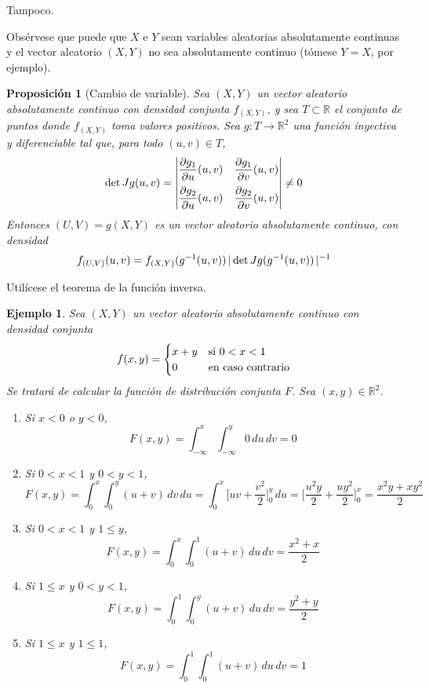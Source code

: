 \documentclass[11pt]{report}
\makeatletter
\renewenvironment{proof}[1][\proofname]{\par
  \pushQED{\qed}%
  \normalfont \topsep\z@skip %
  \trivlist
  \item[\hskip\labelsep
        \itshape
    #1\@addpunct{.}]\ignorespaces
}{%
  \popQED\endtrivlist\@endpefalse
}
\theoremstyle{mytheorem}
\newtheorem{proposition}{Proposición}
\theoremstyle{mydefinition}
\theoremstyle{myexample}
\newtheorem*{example}{Ejemplo}
\let\oldproofname=\proofname
\renewcommand{\proofname}{\rm\bf{\oldproofname}}}
\newenvironment{cproposition} %
  {\begin{mdframed}[
        linewidth=3pt,
        linecolor=c2,
        bottomline=false,
        topline=false,
        rightline=false,
        innerrightmargin=0pt,
        innertopmargin=0pt,
        innerbottommargin=0pt,
        innerleftmargin=1em,
        skipabove=\baselineskip]
    \begin{proposition}}
  {\end{proposition}\end{mdframed}}
\newcommand{\R}{\mathbb R}
\makeatother
\begin{document}
\vspace{0.5\baselineskip}

\begin{proof}
Tampoco.
\end{proof}

Obsérvese que puede que $X$ e $Y$ sean variables aleatorias absolutamente continuas y el vector aleatorio $(X,Y)$ no sea absolutamente continuo (tómese $Y = X$, por ejemplo).

\begin{cproposition}[{Cambio de variable}]
Sea $(X,Y)$ un vector aleatorio absolutamente continuo con densidad conjunta $f_{(X,Y)}$, y sea $T \subset \R$ el conjunto de puntos donde $f_{(X,Y)}$ toma valores positivos. Sea $g \colon T \to \R^2$ una función inyectiva y diferenciable tal que, para todo $(u,v) \in T$,
\[\textup{det}\,Jg(u,v) = \begin{vmatrix}
    \displaystyle\frac{\partial g_1}{\partial u}(u,v) & \displaystyle\frac{\partial g_1}{\partial v}(u,v) \\[9pt]
    \displaystyle\frac{\partial g_2}{\partial u}(u,v) & \displaystyle\frac{\partial g_2}{\partial v}(u,v) \\    
\end{vmatrix} \neq 0\]
Entonces $(U,V) = g(X,Y)$ es un vector aleatorio absolutamente continuo, con densidad
\[f_{(U,V)}(u,v) = f_{(X,Y)}(g^{-1}(u,v))\, |\,\textup{det}\,Jg(g^{-1}(u,v))\,|^{-1}\]
\end{cproposition}

\begin{proof}
Utilícese el teorema de la función inversa.
\end{proof}

\begin{example}
Sea $(X,Y)$ un vector aleatorio absolutamente continuo con densidad conjunta 
\[f(x,y) = \begin{cases}
    x+y & $si$ \ 0<x<1 \\
    0 & $en caso contrario$
\end{cases}\]
Se tratará de calcular la función de distribución conjunta $F$. Sea $(x,y) \in \R^2$.
\begin{enumerate}
    \item Si $x < 0$ o $y < 0$,
    \[F(x,y) = \int_{-\infty}^x \int_{-\infty}^y 0\, du \, dv = 0\]
    \item Si $0<x<1$ y $0<y<1$,
    \[
    F(x,y) =\int_0^x \int_0^y (u+v) \, dv \, du = \int_0^x\biggl[uv+\frac{v^2}{2}\biggr]_0^y \,du = \biggl[\frac{u^2y}{2}+\frac{uy^2}{2}\biggr]_0^x = \frac{x^2y+xy^2}{2}\]
    \item Si $0<x<1$ y $1 \leq y$,
    \[F(x,y) = \int_0^x \int_0^1 (u+v) \, du \, dv = \frac{x^2+x}{2}\]
    \item Si $1 \leq x$ y $0<y<1$,
    \[F(x,y) = \int_0^1 \int_0^y (u+v) \, du \, dv = \frac{y^2+y}{2}\]
    \item Si $1 \leq x$ y $1 \leq 1$,
    \[F(x,y) = \int_0^1 \int_0^1 (u+v) \, du \, dv = 1\]
\end{enumerate}
\end{example}
\end{document}

